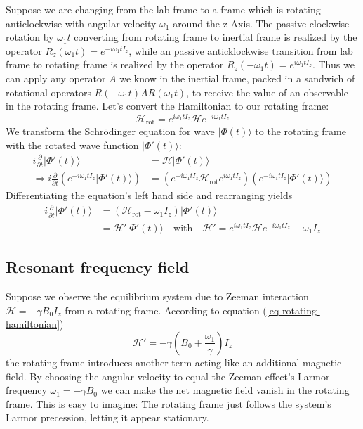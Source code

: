 \documentclass[11.5pt,a4paper]{article}
\begin{document}
Suppose we are changing from the lab frame to a frame which is rotating anticlockwise with angular velocity $\omega_1$ around the z-Axis. 
The passive clockwise rotation by $\omega_1 t$ converting from rotating frame to inertial frame is realized by the operator $R_z(\omega_1 t) = e^{-i \omega_1 t I_z}$, while an passive anticklockwise transition from lab frame to rotating frame is realized by the operator $R_z(-\omega_1 t) =  e^{i \omega_1 t I_z}$. Thus we can apply any operator $A$ we know in the inertial frame, packed in a sandwich of rotational operators $R(-\omega_1 t) A R(\omega_1 t)$, to receive the value of an observable in the rotating frame. Let's convert the Hamiltonian to our rotating frame:
\begin{equation}
 \mathcal{H}_\text{rot} = e^{i \omega_1 t I_z} \mathcal{H} e^{-i \omega_1 t I_z}
\end{equation}
We transform the Schr\"odinger equation for wave $|\Phi(t)\rangle$ to the rotating frame with the rotated wave function $|\Phi'(t)\rangle$:
\begin{align} 
  i\frac{\partial}{\partial t} |\Phi'(t)\rangle   & = \mathcal{H} |\Phi'(t)\rangle  \\
  \Rightarrow i \frac{\partial}{\partial t} \left(e^{-i \omega_1 t I_z} |\Phi'(t)\rangle \right) & = \left( e^{-i \omega_1 t I_z} \mathcal{H}_\text{rot} e^{i \omega_1 t I_z} \right) \left( e^{-i \omega_1 t I_z} |\Phi'(t)\rangle \right)
\end{align}
Differentiating the equation's left hand side and rearranging yields
\begin{align}
 i\frac{\partial}{\partial t} |\Phi'(t)\rangle & = (\mathcal{H}_\text{rot} - \omega_1 I_z) |\Phi'(t)\rangle \\
  & = \mathcal{H}' |\Phi'(t)\rangle \quad \text{with} \quad \mathcal{H}' = e^{i \omega_1 t I_z} \mathcal{H} e^{-i \omega_1 t I_z} - \omega_1 I_z
  \label{eq-rotating-hamiltonian}
\end{align}


\subsection{Resonant frequency field}
Suppose we observe the equilibrium system due to Zeeman interaction $\mathcal{H} = - \gamma B_0 I_z$ from a rotating frame. According to equation (\ref{eq-rotating-hamiltonian})
\begin{equation}
  \mathcal{H'} = -\gamma(B_0 + \frac{\omega_1}{\gamma}) I_z
\end{equation}
the rotating frame introduces another term acting like an additional magnetic field. By choosing the angular velocity to equal the Zeeman effect's Larmor frequency $\omega_1 = -\gamma B_0$ we can make the net magnetic field vanish in the rotating frame. This is easy to imagine: The rotating frame just follows the system's Larmor precession, letting it appear stationary.
\end{document}
